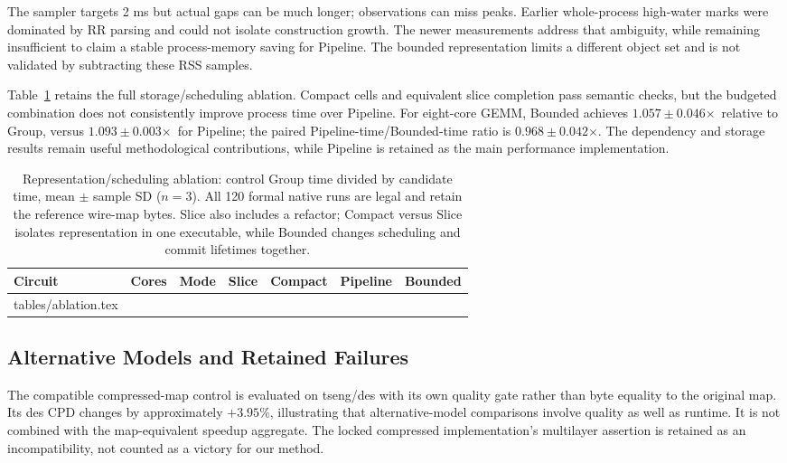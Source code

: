 \documentclass[conference,10pt,letterpaper]{IEEEtran}
\makeatletter
\newcommand{\speedup}{\ensuremath{\times}}
\newcommand{\tableinput}[1]{\@@input #1 }
\makeatother
\begin{document}
The sampler targets 2 ms but actual gaps can be much longer; observations can miss peaks. Earlier whole-process high-water marks were dominated by RR parsing and could not isolate construction growth. The newer measurements address that ambiguity, while remaining insufficient to claim a stable process-memory saving for Pipeline. The bounded representation limits a different object set and is not validated by subtracting these RSS samples.

Table~\ref{tab:ablation} retains the full storage/scheduling ablation. Compact cells and equivalent slice completion pass semantic checks, but the budgeted combination does not consistently improve process time over Pipeline. For eight-core GEMM, Bounded achieves $1.057\pm0.046$\speedup\ relative to Group, versus $1.093\pm0.003$\speedup\ for Pipeline; the paired Pipeline-time/Bounded-time ratio is $0.968\pm0.042$\speedup. The dependency and storage results remain useful methodological contributions, while Pipeline is retained as the main performance implementation.

\begin{table}[t]
\centering\footnotesize
\caption{Representation/scheduling ablation: control Group time divided by candidate time, mean $\pm$ sample SD ($n=3$). All 120 formal native runs are legal and retain the reference wire-map bytes. Slice also includes a refactor; Compact versus Slice isolates representation in one executable, while Bounded changes scheduling and commit lifetimes together.}
\label{tab:ablation}
\setlength{\tabcolsep}{5pt}
\begin{tabular}{llrrrrr}
\toprule
Circuit & Cores & Mode & Slice & Compact & Pipeline & Bounded \\
\midrule
\tableinput{tables/ablation.tex}
\bottomrule
\end{tabular}
\end{table}

\subsection{Alternative Models and Retained Failures}
The compatible compressed-map control is evaluated on tseng/des with its own quality gate rather than byte equality to the original map. Its des CPD changes by approximately $+3.95\%$, illustrating that alternative-model comparisons involve quality as well as runtime. It is not combined with the map-equivalent speedup aggregate. The locked compressed implementation's multilayer assertion is retained as an incompatibility, not counted as a victory for our method.
\end{document}
